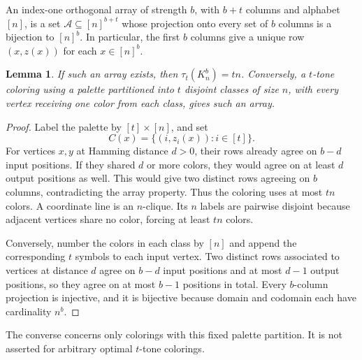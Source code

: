 \documentclass[11pt,a4paper]{article}
\newtheorem{SourceRbdTlemma}[SourceRbdTtheorem]{Lemma}
\begin{document}
An index-one orthogonal array of strength $b$, with $b+t$ columns and alphabet $[n]$, is a set $\mathcal A\subseteq[n]^{b+t}$ whose projection onto every set of $b$ columns is a bijection to $[n]^b$. In particular, the first $b$ columns give a unique row $(x,z(x))$ for each $x\in[n]^b$.

\begin{SourceRbdTlemma}\label{R13T:transfer}
If such an array exists, then $\tau_t(K_n^b)=tn$. Conversely, a $t$-tone coloring using a palette partitioned into $t$ disjoint classes of size $n$, with every vertex receiving one color from each class, gives such an array.
\end{SourceRbdTlemma}
\begin{proof}
Label the palette by $[t]\times[n]$, and set
\[
C(x)=\big\{(i,z_i(x)):i\in[t]\big\}.
\]
For vertices $x,y$ at Hamming distance $d>0$, their rows already agree on $b-d$ input positions. If they shared $d$ or more colors, they would agree on at least $d$ output positions as well. This would give two distinct rows agreeing on $b$ columns, contradicting the array property. Thus the coloring uses at most $tn$ colors. A coordinate line is an $n$-clique. Its $n$ labels are pairwise disjoint because adjacent vertices share no color, forcing at least $tn$ colors.

Conversely, number the colors in each class by $[n]$ and append the corresponding $t$ symbols to each input vertex. Two distinct rows associated to vertices at distance $d$ agree on $b-d$ input positions and at most $d-1$ output positions, so they agree on at most $b-1$ positions in total. Every $b$-column projection is injective, and it is bijective because domain and codomain each have cardinality $n^b$.
\end{proof}
The converse concerns only colorings with this fixed palette partition. It is not asserted for arbitrary optimal $t$-tone colorings.
\end{document}
